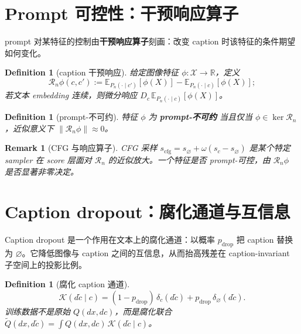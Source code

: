 \documentclass[11pt,a4paper]{article}
\newtheorem{definition}[theorem]{Definition}
\newtheorem{remark}[theorem]{Remark}
\newcommand{\E}{\mathbb{E}}
\newcommand{\R}{\mathbb{R}}
\newcommand{\cR}{\mathcal{R}}
\newcommand{\cK}{\mathcal{K}}
\newcommand{\cX}{\mathcal{X}}
\newcommand{\nul}{\varnothing}
\begin{document}
\section{Prompt 可控性：干预响应算子}
\label{sec:response}

prompt 对某特征的控制由\textbf{干预响应算子}刻画：改变 caption 时该特征的条件期望如何变化。

\begin{definition}[caption 干预响应]
给定图像特征 $\phi:\cX\to\R$，定义
\begin{equation}\label{eq:response_op}
\cR_n\phi(c,c') := \E_{P_n(\cdot\mid c')}[\phi(X)] - \E_{P_n(\cdot\mid c)}[\phi(X)];
\end{equation}
若文本 embedding 连续，则微分响应 $D_c\,\E_{P_n(\cdot\mid c)}[\phi(X)]$。
\end{definition}

\begin{definition}[prompt-不可约]
特征 $\phi$ 为 \textbf{prompt-不可约} 当且仅当 $\phi\in\ker\cR_n$，近似意义下 $\|\cR_n\phi\|\approx 0$。
\end{definition}

\begin{remark}[CFG 与响应算子]
CFG 采样 $s_{\mathrm{cfg}}=s_\nul+\omega(s_c-s_\nul)$ 是某个特定 sampler 在 score 层面对 $\cR_n$ 的近似放大。一个特征是否 prompt-可控，由 $\cR_n\phi$ 是否显著非零决定。
\end{remark}

\section{Caption dropout：腐化通道与互信息}
\label{sec:dropout_channel}

Caption dropout 是一个作用在文本上的腐化通道：以概率 $p_{\mathrm{drop}}$ 把 caption 替换为 $\nul$。它降低图像与 caption 之间的互信息，从而抬高残差在 caption-invariant 子空间上的投影比例。

\begin{definition}[腐化 caption 通道]
\begin{equation}\label{eq:dropout_channel}
\cK(d\tilde c\mid c) = (1-p_{\mathrm{drop}})\,\delta_c(d\tilde c) + p_{\mathrm{drop}}\,\delta_{\nul}(d\tilde c).
\end{equation}
训练数据不是原始 $Q(dx,dc)$，而是腐化联合 $\widetilde Q(dx,d\tilde c) = \int Q(dx,dc)\,\cK(d\tilde c\mid c)$。
\end{definition}
\end{document}
